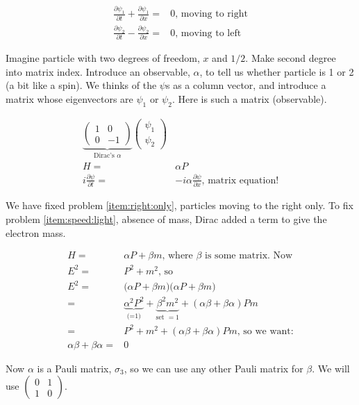 \documentclass[]{article}
\begin{document}
\begin{align*}
	\frac{\partial \psi_1}{\partial t} + \frac{\partial \psi_1}{\partial x}=&0 \text{, moving to right}\\
	\frac{\partial \psi_2}{\partial t} - \frac{\partial \psi_2}{\partial x}=&0 \text{, moving to left}
\end{align*}

Imagine particle with two degrees of freedom, $x$ and $1/2$. Make second degree into matrix index. Introduce an observable, $\alpha$, to tell us whether particle is 1 or 2 (a bit like a spin). We thinks of the $\psi$s as a column vector, and introduce a matrix whose eigenvectors are $\psi_1$ or $\psi_2$. Here is such a matrix (observable).

\begin{align*}
	\underbrace{
		\begin{pmatrix}
			1 & 0\\
			0 & -1
		\end{pmatrix}
	}_\text{Dirac's $\alpha$}
	\begin{pmatrix}
		\psi_1\\
		\psi_2
	\end{pmatrix}\\
	H =& \alpha P\\
	i\frac{\partial \psi}{\partial t} =& -i \alpha \frac{\partial \psi}{\partial x} \text{, matrix equation!}
\end{align*}

We have fixed problem \ref{item:right:only}, particles moving to the right only. To fix problem \ref{item:speed:light}, absence of mass, Dirac added a term to give the electron mass. 

\begin{align*}
	H =& \alpha P + \beta m \text{, where $\beta$ is some matrix. Now}\\
	E^2 =& P^2 + m^2 \text{, so}\\
	E^2 =& \big(\alpha P + \beta m \big) \big(\alpha P + \beta m \big)\\
	=& \underbrace{\alpha^2 P^2}_\text{(=1)} + \underbrace{\beta^2 m^2}_\text{set  $=1$} + (\alpha \beta + \beta \alpha) P m\\
	=&  P^2 + m^2 + (\alpha \beta + \beta \alpha) P m \text{, so we want:}\\
	\alpha \beta + \beta \alpha=&0
\end{align*}

Now $\alpha$ is a Pauli matrix, $\sigma_3$, so we can use any other Pauli matrix for $\beta$. We will use
$
	\begin{pmatrix}
		0&1\\
		1&0
	\end {pmatrix}
$.
\end{document}
